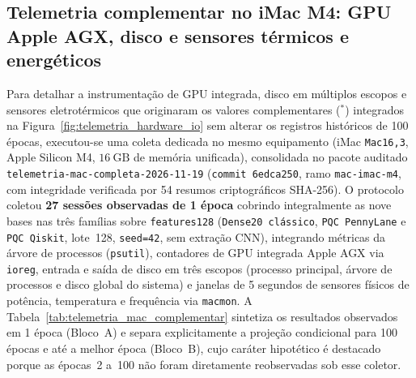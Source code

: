 \documentclass[
    12pt,
    openright,
    oneside,
    a4paper,
    english,
    brazil
]{abntex2}
\begin{document}
\subsection{Telemetria complementar no iMac M4: GPU Apple AGX, disco e sensores térmicos e energéticos}

Para detalhar a instrumentação de GPU integrada, disco em múltiplos escopos e sensores eletrotérmicos que originaram os valores complementares (\(^\ast\)) integrados na Figura~\ref{fig:telemetria_hardware_io} sem alterar os registros históricos de 100 épocas, executou-se uma coleta dedicada no mesmo equipamento (iMac \texttt{Mac16,3}, Apple Silicon M4, \(16~\text{GB}\) de memória unificada), consolidada no pacote auditado \texttt{telemetria-mac-\allowbreak completa-2026-11-19} (\texttt{commit 6edca250}, ramo \texttt{mac-imac-m4}, com integridade verificada por 54 resumos criptográficos SHA-256). O protocolo coletou \textbf{27 sessões observadas de 1 época} cobrindo integralmente as nove bases nas três famílias sobre \texttt{features128} (\texttt{Dense20 clássico}, \texttt{PQC PennyLane} e \texttt{PQC Qiskit}, lote~128, \texttt{seed=42}, sem extração CNN), integrando métricas da árvore de processos (\texttt{psutil}), contadores de GPU integrada Apple AGX via \texttt{ioreg}, entrada e saída de disco em três escopos (processo principal, árvore de processos e disco global do sistema) e janelas de 5 segundos de sensores físicos de potência, temperatura e frequência via \texttt{macmon}. A Tabela~\ref{tab:telemetria_mac_complementar} sintetiza os resultados observados em 1 época (Bloco~A) e separa explicitamente a projeção condicional para 100 épocas e até a melhor época (Bloco~B), cujo caráter hipotético é destacado porque as épocas~2 a~100 não foram diretamente reobservadas sob esse coletor.
\end{document}

